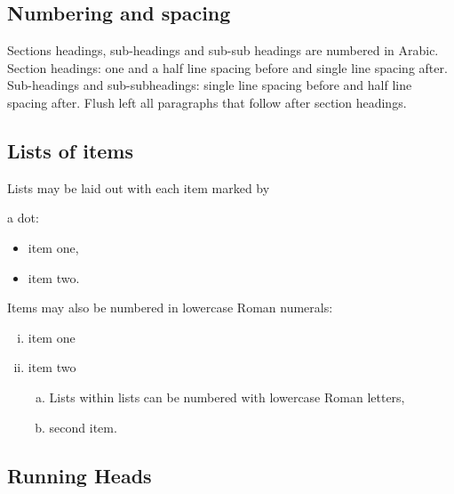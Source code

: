 \documentclass[11pt,twoside]{article}
\begin{document}
\begin{multicols}{2}
\subsection{Numbering and spacing}

Sections headings, sub-headings and sub-sub headings are numbered in Arabic. Section headings: one and a half line spacing before and single line spacing after. Sub-headings and sub-subheadings: single line spacing before and half line spacing after. Flush left all paragraphs that follow after section headings.

\subsection{Lists of items}

{Lists may be laid out with each item marked by\hfilneg}

\noindent a dot:
\begin{itemize}
\item item one,
\item item two.
\end{itemize}

\setcounter{footnote}{0}
\renewcommand{\thefootnote}{\alph{footnote}}

Items may also be numbered in lowercase Roman numerals:
\begin{enumerate}[(i)]\Nospacing
\item item one
\item item two
    \begin{enumerate}[(a)]\Nospacing
    \item Lists within lists can be numbered with lowercase Roman letters,
    \item second item.
    \end{enumerate}
\end{enumerate}
\vspace*{-5pt}
\subsection{Running Heads}


\end{multicols}
\end{document}
